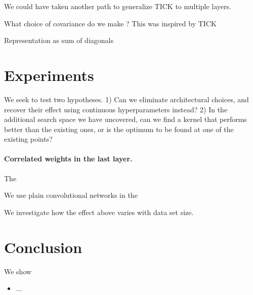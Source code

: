 \documentclass{article}
\theoremstyle{definition}
\newcommand{\adriacomment}[1]{\todo[color=blue]{#1}\xspace}
\newcommand{\vK}{\mathbf{K}}
\newcommand{\eye}{\mathbf{I}}
\newcommand{\bracket}[3]{{\left#1 #3 \right#2}}
\newcommand{\bra}{\bracket{(}{)}}
\newcommand{\indicator}[1]{{\mathds{1}}\left[#1\right]}
\begin{document}
We could have taken another path to generalize TICK to multiple layers.

What choice of covariance do we make ?
This was inspired by TICK

Representation as sum of diagonals

\section{Experiments}
We seek to test two hypotheses. 1) Can we eliminate architectural choices, and
recover their effect using continuous hyperparameters instead? 
2) In the additional search space we have uncovered, can we find a kernel that
performs better than the existing ones, or is the optimum to be found at one of
the existing points? \adriacomment{reword}




\paragraph{Correlated weights in the last layer.} The 


We use plain convolutional networks in the 

We investigate how the effect above varies with data set size.



\section{Conclusion}
We show
\begin{itemize}
    \item ...
\end{itemize}
\end{document}
